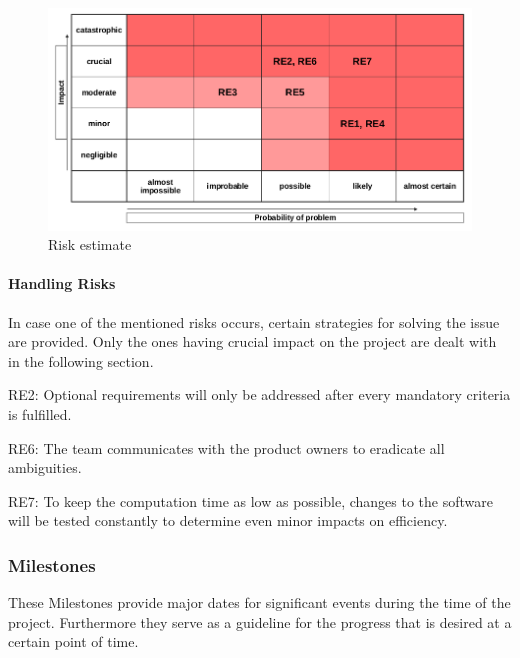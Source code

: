 \begin{figure}[h]
	\begin{center}
		\includegraphics[width= 15cm]{figures/risikoabschaetzung.png}
		\caption{Risk estimate}
	\end{center}
\end{figure}

\paragraph{Handling Risks}

In case one of the mentioned risks occurs, certain strategies for solving the issue are provided. Only the ones having crucial impact on the project are dealt with in the following section.

\begin{aims}
	
	\item[RE2:]Optional requirements will only be addressed after every mandatory criteria is fulfilled.
	\item[RE6:]The team communicates with the product owners to eradicate all ambiguities.
	\item[RE7:]To keep the computation time as low as possible, changes to the software will be tested constantly to 						   determine even minor impacts on efficiency. 	
	
\end{aims}

\clearpage

\subsubsection{Milestones} 
These Milestones provide major dates for significant events during the time of the project. Furthermore they serve as a guideline for the progress that is desired at a certain point of time.
~\\
~\\

